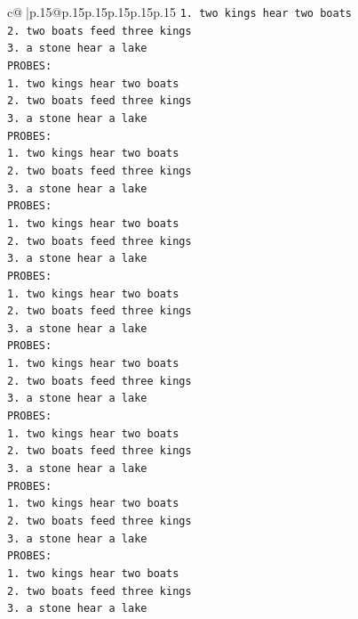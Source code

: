 \documentclass{article}
\begin{document}
{\begin{supertabular}{c@{$\;$}|p{.15\linewidth}@{}p{.15\linewidth}p{.15\linewidth}p{.15\linewidth}p{.15\linewidth}p{.15\linewidth}}
{{{\texttt{1. two kings hear two boats} \\
\texttt{2. two boats feed three kings} \\
\texttt{3. a stone hear a lake} \\
\texttt{PROBES:} \\
\texttt{1. two kings hear two boats} \\
\texttt{2. two boats feed three kings} \\
\texttt{3. a stone hear a lake} \\
\texttt{PROBES:} \\
\texttt{1. two kings hear two boats} \\
\texttt{2. two boats feed three kings} \\
\texttt{3. a stone hear a lake} \\
\texttt{PROBES:} \\
\texttt{1. two kings hear two boats} \\
\texttt{2. two boats feed three kings} \\
\texttt{3. a stone hear a lake} \\
\texttt{PROBES:} \\
\texttt{1. two kings hear two boats} \\
\texttt{2. two boats feed three kings} \\
\texttt{3. a stone hear a lake} \\
\texttt{PROBES:} \\
\texttt{1. two kings hear two boats} \\
\texttt{2. two boats feed three kings} \\
\texttt{3. a stone hear a lake} \\
\texttt{PROBES:} \\
\texttt{1. two kings hear two boats} \\
\texttt{2. two boats feed three kings} \\
\texttt{3. a stone hear a lake} \\
\texttt{PROBES:} \\
\texttt{1. two kings hear two boats} \\
\texttt{2. two boats feed three kings} \\
\texttt{3. a stone hear a lake} \\
\texttt{PROBES:} \\
\texttt{1. two kings hear two boats} \\
\texttt{2. two boats feed three kings} \\
\texttt{3. a stone hear a lake} \\
}}}
\end{supertabular}}
\end{document}
